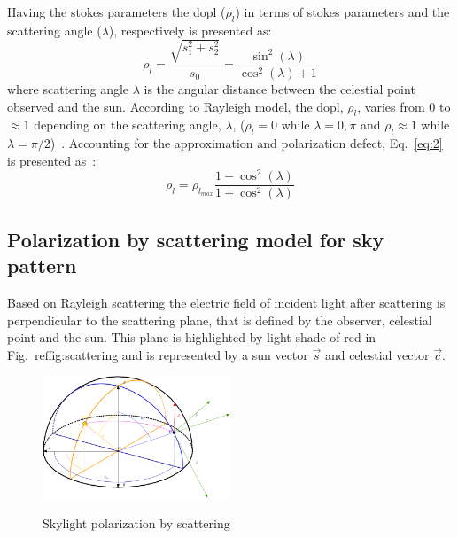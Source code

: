 Having the stokes parameters the \gls{dopl} ($\rho_{l}$) in terms of stokes
parameters and the scattering angle ($\lambda$), respectively is presented as:
\begin{equation}
  \label{eq:2}
  \rho_{l} = \frac{\sqrt{s_{1}^{2}+s_{2}^{2}}}{s_0} =
  \frac{\sin^{2}(\lambda)}{\cos^{
      2}(\lambda)+1}
\end{equation}
\noindent where scattering angle $\lambda$ is the angular distance between the
celestial point observed and the sun.
According to Rayleigh model, the \gls{dopl}, $\rho_{l}$, varies
from 0 to $\approx 1$ depending on the scattering angle, $\lambda$, ($\rho_{l} =
0$ while $\lambda = 0, \pi$ and $\rho_{l} \approx 1$ while $\lambda =
\pi/2$)~\cite{smith2007polarization, miyazaki09sunlightpolarization}.
Accounting for the approximation and polarization defect, Eq.~\ref{eq:2}
is presented as~\cite{pomozi2001clearsky}:
\begin{equation}
  \label{eq:3}
  \rho_{l} = \rho_{l_{max}}\frac{1 - \cos^{2}(\lambda)}{1 + \cos^{
      2}(\lambda)}
\end{equation}


\subsection{Polarization by scattering model for sky pattern}
Based on Rayleigh scattering the electric field of incident light after
scattering is perpendicular to the scattering plane, that is defined by the
observer, celestial point and the sun.
This plane is highlighted by light shade of red in Fig.~ref{fig:scattering} and
is represented by a sun vector $\vec{s}$ and celestial vector $\vec{c}$.

\begin{figure}
  \centering
  \includegraphics[width=0.5\textwidth]{./content/intro/figures/polasky4-crop.pdf}
  \label{fig:scattering}
  \caption{Skylight polarization by scattering}
\end{figure}




